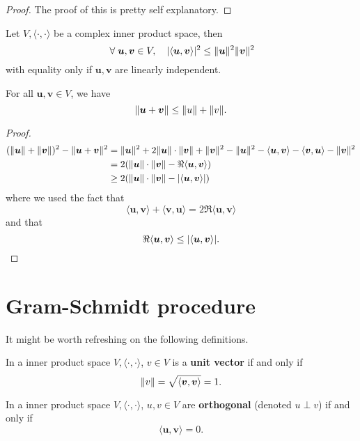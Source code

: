 \begin{proof}
    The proof of this is pretty self explanatory.
\end{proof}

\begin{theorem}
    Let $V, \langle \cdot, \cdot \rangle$ be a complex inner product space, then \[ \; \forall \; \bm u, \bm v \in V, \quad \lvert\langle \bm u, \bm v \rangle\rvert^2 \leq \lVert\bm u\rVert^2 \lVert\bm v\rVert^2 \] with equality only if $\bm u, \bm v$ are linearly independent.
\end{theorem}

\begin{corollary}
    For all $\bm u, \bm v \in V$, we have \[ \lVert\bm u + \bm v\rVert \leq \lVert u\rVert + \lVert v\rVert. \]
\end{corollary}

\begin{proof}
    \begin{align*}
        (\lVert\bm u\rVert + \lVert\bm v\rVert)^2 - \lVert\bm u + \bm v\rVert^2 &= \lVert\bm u\rVert^2 + 2 \lVert\bm u\rVert \cdot \lVert\bm v\rVert + \lVert\bm v\rVert^2 - \lVert\bm u\rVert^2 - \langle \bm u, \bm v \rangle - \langle \bm v, \bm u \rangle - \lVert\bm v\rVert^2 \\
        &= 2 (\lVert\bm u\rVert \cdot \lVert\bm v\rVert - \Re \langle \bm u, \bm v \rangle ) \\
        &\geq 2(\lVert\bm u\rVert \cdot \lVert\bm v\rVert - \lvert\langle \bm u, \bm v \rangle\rvert)
    \end{align*}
    where we used the fact that \[ \langle \bm u, \bm v \rangle + \langle \bm v, \bm u \rangle = 2 \Re \langle \bm u, \bm v \rangle \] and that \[ \Re \langle \bm u, \bm v \rangle \leq \lvert\langle \bm u, \bm v \rangle\rvert. \]
\end{proof}

\section{Gram-Schmidt procedure}

It might be worth refreshing on the following definitions.

\begin{definition}
    In a inner product space $V, \langle \cdot, \cdot \rangle$, $v \in V$ is a \textbf{unit vector} if and only if \[ \lVert v\rVert = \sqrt{\langle \bm v, \bm v \rangle} = 1. \]
\end{definition}

\begin{definition}
    In a inner product space $V, \langle \cdot, \cdot \rangle$, $u, v \in V$ are \textbf{orthogonal} (denoted $u \perp v$) if and only if \[ \langle \bm u, \bm v \rangle = 0. \]
\end{definition}

